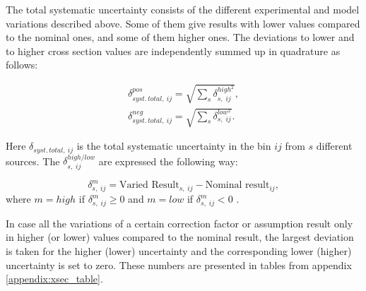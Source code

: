 The total systematic uncertainty consists of the different experimental and model variations described above.
Some of them give results with lower values compared to the nominal ones, and some of them higher ones.
The deviations to lower and to higher cross section values are independently summed up in quadrature as follows:

\begin{align}
 \delta_{syst.\,total,\:ij}^{pos} = \sqrt{\sum_{s}\delta_{s,\;ij}^{high^{2}}}, \\
 \delta_{syst.\,total,\:ij}^{neg} = \sqrt{\sum_{s}\delta_{s,\;ij}^{low^{2}}}.
\end{align}

Here $\delta_{syst.\,total,\:ij}$ is the total systematic uncertainty in the bin $ij$ from
$s$ different sources. The $\delta_{s,\;ij}^{high/low}$ are expressed the following way:

\begin{equation}
 \delta_{s,\;ij}^{m} = \textrm{Varied Result}_{s,\;ij} - \textrm{Nominal result}_{ij}, 
\end{equation}
where $m = high$ if $\delta_{s,\;ij}^{m} \geq 0$ and $m = low$ if $\delta_{s,\;ij}^{m} < 0$ . 

In case all the variations of a certain correction factor or assumption result only in higher (or lower) values 
compared to the nominal result, the largest deviation is taken for the higher (lower) uncertainty and the corresponding 
lower (higher) uncertainty is set to zero. These numbers are presented
in tables from appendix \ref{appendix:xsec_table}.

% 

% 
% 
% 
% 

